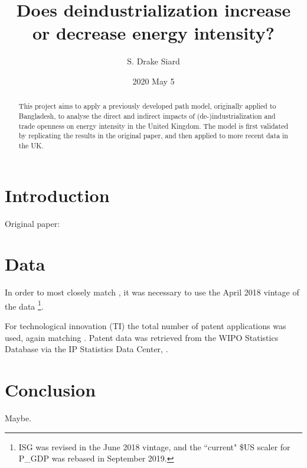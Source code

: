 \documentclass[11pt]{article}
\title{\textbf{Does deindustrialization increase or decrease energy intensity?}}
\author{S. Drake Siard}
\date{2020 May 5}
\begin{document}
\maketitle

\begin{abstract}
This project aims to apply a previously developed path model, originally applied to Bangladesh, to analyse the direct and indirect impacts of (de-)industrialization and trade openness on energy intensity in the United Kingdom. 
The model is first validated by replicating the results in the original paper, and then applied to more recent data in the UK.
\end{abstract}

\tableofcontents

\section{Introduction}
Original paper: \cite{panHowIndustrializationTrade2019}

\section{Data}

In order to most closely match \cite{panHowIndustrializationTrade2019}, it was necessary to use the April 2018 vintage of the data
\footnote{ISG was revised in the June 2018 vintage, and the ``current" \$US scaler for P\_GDP was rebased in September 2019.}.

For technological innovation (TI) the total number of patent applications was used, again matching \cite{panHowIndustrializationTrade2019}.
Patent data was retrieved from the WIPO Statistics Database via the IP Statistics Data Center, \cite{worldintellectualpropertyorganisationWIPOStatisticsDatabase2020}.



\section{Conclusion}
Maybe.


\end{document}
